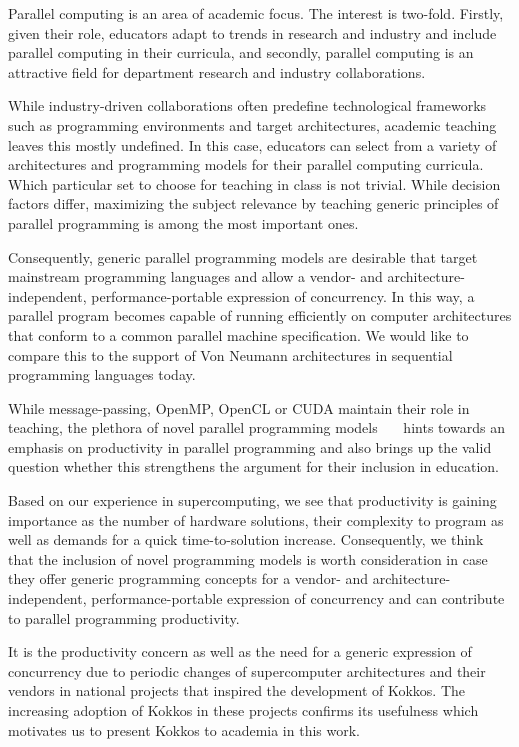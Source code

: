 
Parallel computing is an area of academic focus. The interest is two-fold. Firstly, given their role, educators adapt to trends in research and industry and include parallel computing in their curricula, and secondly, parallel computing is an attractive field for department research and industry collaborations. 

While industry-driven collaborations often predefine technological frameworks such as programming environments and target architectures, academic teaching leaves this mostly undefined. In this case, educators can select from a variety of architectures and programming models for their parallel computing curricula. Which particular set to choose for teaching in class is not trivial. While decision factors differ, maximizing the subject relevance by teaching generic principles of parallel programming is among the most important ones. 

Consequently, generic parallel programming models are desirable that target mainstream programming languages and allow a vendor- and architecture-independent, performance-portable expression of concurrency. In this way, a parallel program becomes capable of running efficiently on computer architectures that conform to a common parallel machine specification. We would like to compare this to the support of Von Neumann architectures in sequential programming languages today. 

While message-passing, OpenMP, OpenCL or CUDA maintain their role in teaching, the plethora of novel parallel programming models~\cite{Chapel}~\cite{UPC++}~\cite{Raja} hints towards an emphasis on productivity in parallel programming and also brings up the valid question whether this strengthens the argument for their inclusion in education. 

Based on our experience in supercomputing, we see that productivity is gaining importance as the number of hardware solutions, their complexity to program as well as demands for a quick time-to-solution increase. Consequently, we think that the inclusion of novel programming models is worth consideration in case they offer generic programming concepts for a vendor- and architecture-independent, performance-portable expression of concurrency and can contribute to parallel programming productivity. 

It is the productivity concern as well as the need for a generic expression of concurrency due to periodic changes of supercomputer architectures and their vendors in national projects that inspired the development of Kokkos. The increasing adoption of Kokkos in these projects confirms its usefulness which motivates us to present Kokkos to academia in this work.

